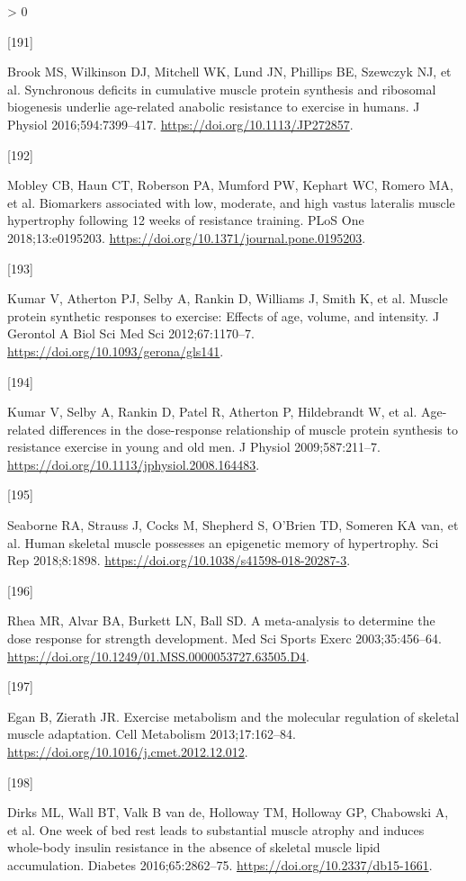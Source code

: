 \documentclass[twoside,10pt]{gihclass} %
\newlength{\cslhangindent}
\newlength{\csllabelwidth}
\newenvironment{CSLReferences}[3] %
 {%
  \setlength{\parindent}{0pt}
  \ifodd #1 \everypar{\setlength{\hangindent}{\cslhangindent}}\ignorespaces\fi
  \ifnum #2 > 0
  \setlength{\parskip}{#2\baselineskip}
  \fi
 }%
 {}
\newcommand{\CSLLeftMargin}[1]{\parbox[t]{\maxof{\widthof{#1}}{\csllabelwidth}}{#1}}
\newcommand{\CSLRightInline}[1]{\parbox[t]{\linewidth}{#1}}
\begin{document}
\begin{CSLReferences}{0}{0}
\leavevmode\hypertarget{ref-RN1809}{}%
\CSLLeftMargin{{[}191{]} }
\CSLRightInline{Brook MS, Wilkinson DJ, Mitchell WK, Lund JN, Phillips BE, Szewczyk NJ, et al. Synchronous deficits in cumulative muscle protein synthesis and ribosomal biogenesis underlie age-related anabolic resistance to exercise in humans. J Physiol 2016;594:7399--417. \url{https://doi.org/10.1113/JP272857}.}

\leavevmode\hypertarget{ref-RN2055}{}%
\CSLLeftMargin{{[}192{]} }
\CSLRightInline{Mobley CB, Haun CT, Roberson PA, Mumford PW, Kephart WC, Romero MA, et al. Biomarkers associated with low, moderate, and high vastus lateralis muscle hypertrophy following 12 weeks of resistance training. PLoS One 2018;13:e0195203. \url{https://doi.org/10.1371/journal.pone.0195203}.}

\leavevmode\hypertarget{ref-RN2716}{}%
\CSLLeftMargin{{[}193{]} }
\CSLRightInline{Kumar V, Atherton PJ, Selby A, Rankin D, Williams J, Smith K, et al. Muscle protein synthetic responses to exercise: Effects of age, volume, and intensity. J Gerontol A Biol Sci Med Sci 2012;67:1170--7. \url{https://doi.org/10.1093/gerona/gls141}.}

\leavevmode\hypertarget{ref-RN2720}{}%
\CSLLeftMargin{{[}194{]} }
\CSLRightInline{Kumar V, Selby A, Rankin D, Patel R, Atherton P, Hildebrandt W, et al. Age-related differences in the dose-response relationship of muscle protein synthesis to resistance exercise in young and old men. J Physiol 2009;587:211--7. \url{https://doi.org/10.1113/jphysiol.2008.164483}.}

\leavevmode\hypertarget{ref-RN2012}{}%
\CSLLeftMargin{{[}195{]} }
\CSLRightInline{Seaborne RA, Strauss J, Cocks M, Shepherd S, O'Brien TD, Someren KA van, et al. Human skeletal muscle possesses an epigenetic memory of hypertrophy. Sci Rep 2018;8:1898. \url{https://doi.org/10.1038/s41598-018-20287-3}.}

\leavevmode\hypertarget{ref-RN1486}{}%
\CSLLeftMargin{{[}196{]} }
\CSLRightInline{Rhea MR, Alvar BA, Burkett LN, Ball SD. A meta-analysis to determine the dose response for strength development. Med Sci Sports Exerc 2003;35:456--64. \url{https://doi.org/10.1249/01.MSS.0000053727.63505.D4}.}

\leavevmode\hypertarget{ref-RN2364}{}%
\CSLLeftMargin{{[}197{]} }
\CSLRightInline{Egan B, Zierath JR. Exercise metabolism and the molecular regulation of skeletal muscle adaptation. Cell Metabolism 2013;17:162--84. \url{https://doi.org/10.1016/j.cmet.2012.12.012}.}

\leavevmode\hypertarget{ref-RN2365}{}%
\CSLLeftMargin{{[}198{]} }
\CSLRightInline{Dirks ML, Wall BT, Valk B van de, Holloway TM, Holloway GP, Chabowski A, et al. One week of bed rest leads to substantial muscle atrophy and induces whole-body insulin resistance in the absence of skeletal muscle lipid accumulation. Diabetes 2016;65:2862--75. \url{https://doi.org/10.2337/db15-1661}.}


\end{CSLReferences}
\end{document}

